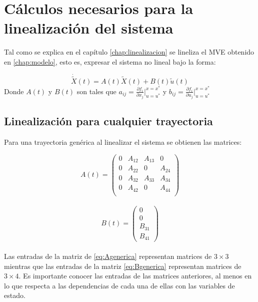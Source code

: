 %


\chapter{C\'alculos necesarios para la linealizaci\'on del sistema}
\label{chap:anexo_linealizacion}

Tal como se explica en el cap\'itulo \ref{chap:linealizacion} se lineliza el MVE obtenido en \ref{chap:modelo}, esto es, expresar el sistema no lineal bajo la forma:

\begin{equation}
\dot{\tilde{X}}(t)=A(t)\tilde{X}(t)+B(t)\tilde{u}(t)
\end{equation}
Donde $A(t)$ y $B(t)$ son tales que $a_{ij}= \frac{\partial f_i}{\partial x_j}\vert_{u=u^*}^{x=x^*}$ y  $b_{ij}= \frac{\partial f_i}{\partial u_j}\vert_{u=u^*}^{x=x^*}$

\section{Linealizaci\'on para cualquier trayectoria}

Para una trayectoria gen\'erica al linealizar el sistema se obtienen las matrices:

\begin{equation}
\label{eq:Agenerica}
A(t)=\left(\begin{array}{cccc}
0 & A_{12} & A_{13} & 0 \\
0 & A_{22} & 0      & A_{24}\\
0 & A_{32} & A_{33} & A_{34}\\
0 & A_{42}     & 0      & A_{44} \\    
\end{array}\right)
\end{equation}\\


\begin{equation}
\label{eq:Bgenerica}
B(t)=\left(\begin{array}{c}
0\\
0\\
B_{31}\\
B_{41} 
\end{array}\right)
\end{equation}\\
Las entradas de la matriz de \ref{eq:Agenerica} representan matrices de $3\times3$ mientras que las entradas de la matriz \ref{eq:Bgenerica} representan matrices de $3\times4$. Es importante conocer las entradas de las matrices anteriores, al menos en lo que respecta a las dependencias de cada una de ellas con las variables de estado. 

